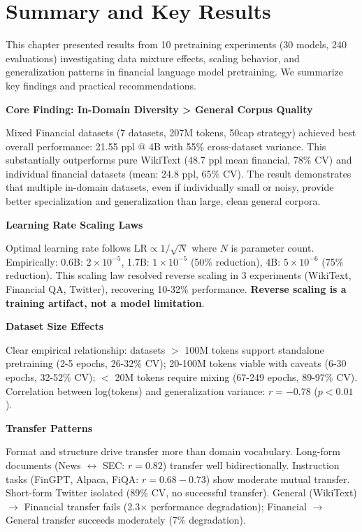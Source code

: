 \section{Summary and Key Results}

This chapter presented results from 10 pretraining experiments (30 models, 240 evaluations) investigating data mixture effects, scaling behavior, and generalization patterns in financial language model pretraining. We summarize key findings and practical recommendations.

\textbf{Core Finding: In-Domain Diversity > General Corpus Quality}

Mixed Financial datasets (7 datasets, 207M tokens, 50cap strategy) achieved best overall performance: 21.55 ppl @ 4B with 55\% cross-dataset variance. This substantially outperforms pure WikiText (48.7 ppl mean financial, 78\% CV) and individual financial datasets (mean: 24.8 ppl, 65\% CV). The result demonstrates that multiple in-domain datasets, even if individually small or noisy, provide better specialization and generalization than large, clean general corpora.

\textbf{Learning Rate Scaling Laws}

Optimal learning rate follows $\text{LR} \propto 1/\sqrt{N}$ where $N$ is parameter count. Empirically: 0.6B: $2 \times 10^{-5}$, 1.7B: $1 \times 10^{-5}$ (50\% reduction), 4B: $5 \times 10^{-6}$ (75\% reduction). This scaling law resolved reverse scaling in 3 experiments (WikiText, Financial QA, Twitter), recovering 10-32\% performance. \textbf{Reverse scaling is a training artifact, not a model limitation}.

\textbf{Dataset Size Effects}

Clear empirical relationship: datasets $>$ 100M tokens support standalone pretraining (2-5 epochs, 26-32\% CV); 20-100M tokens viable with caveats (6-30 epochs, 32-52\% CV); $<$ 20M tokens require mixing (67-249 epochs, 89-97\% CV). Correlation between log(tokens) and generalization variance: $r = -0.78$ ($p < 0.01$).

\textbf{Transfer Patterns}

Format and structure drive transfer more than domain vocabulary. Long-form documents (News $\leftrightarrow$ SEC: $r = 0.82$) transfer well bidirectionally. Instruction tasks (FinGPT, Alpaca, FiQA: $r = 0.68-0.73$) show moderate mutual transfer. Short-form Twitter isolated (89\% CV, no successful transfer). General (WikiText) $\to$ Financial transfer fails (2.3$\times$ performance degradation); Financial $\to$ General transfer succeeds moderately (7\% degradation).

